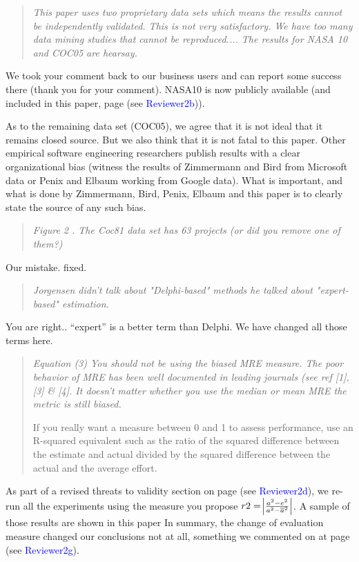 \documentclass[smallcondesed]{svjour3}
\newcommand{\WHERE}[1]{page \pageref{err:#1} (see \textcolor{blue}{#1})}
\begin{document}
\begin{quote}{\em 
  This paper uses two proprietary data sets which means the results cannot be independently validated. This is not very satisfactory. We have too many data mining studies that cannot be reproduced....
The results for NASA 10 and COC05 are hearsay.}\end{quote}

We took your comment back to our business users and can report some success there (thank you for your comment).
NASA10 is now publicly available (and included in this paper, \WHERE{Reviewer2b}).

As to the remaining data set (COC05),
we agree that it is not ideal that it remains closed source.  But
we also think that it is not fatal to this paper. 
Other empirical software engineering researchers publish
results with a clear organizational bias (witness the results
of Zimmermann and Bird from Microsoft data
or Penix and Elbaum working from Google data). What is important, and what is done by Zimmermann, Bird,
Penix, Elbaum and this paper is to clearly state the source of any such bias.

\begin{quote}{\em Figure 2 . The Coc81 data set has 63 projects (or did you remove one of them?)}\end{quote}

\noindent Our mistake. fixed.

\begin{quote}{\em Jorgensen didn't talk about "Delphi-based" methods he talked about  "expert-based" estimation.}\end{quote}

\noindent You are right.. ``expert'' is a better term than Delphi. We have changed all those terms here.


\begin{quote}{\em Equation (3) You should not be using the biased
  MRE measure. The poor behavior of MRE has been
  well documented in leading journals (see ref [1],
  [3] \& [4]. It doesn't matter whether you use the
  median or mean MRE the metric is still
  biased.

  If you really want a measure between 0 and 1 to
  assess performance, use an R-squared equivalent
  such as the ratio of the squared difference
  between the estimate and actual divided by the
  squared difference between the actual and the
  average effort.  }\end{quote}

\noindent As part of a revised threats to validity section on \WHERE{Reviewer2d}, we 
re-run all the experiments using the measure you propose $r2=\abs{\frac{a^2-e^2}{a^2 - \overline{a}^2}}$.
A sample of those results are shown in this paper 
In summary, the change of evaluation measure
changed our conclusions not at all, something we commented on 
at \WHERE{Reviewer2g}. 
\end{document}
